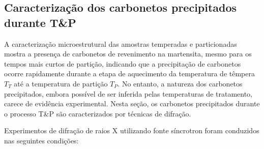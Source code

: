 \subsection{Caracterização dos carbonetos precipitados durante T\&P}

A caracterização microestrutural das amostras temperadas e particionadas mostra a presença de carbonetos de revenimento na martensita, mesmo para os tempos mais curtos de partição, indicando que a precipitação de carbonetos ocorre rapidamente durante a etapa de aquecimento da temperatura de têmpera $T_T$ até a temperatura de partição $T_P$. No entanto, a natureza dos carbonetos precipitados, embora possível de ser inferida pelas temperaturas de tratamento, carece de evidência experimental. Nesta seção, os carbonetos precipitados durante o processo T\&P são caracterizados por técnicas de difração.

Experimentos de difração de raios X utilizando fonte síncrotron foram conduzidos nas seguintes condições:

\begin{itemize}

\end{itemize}

